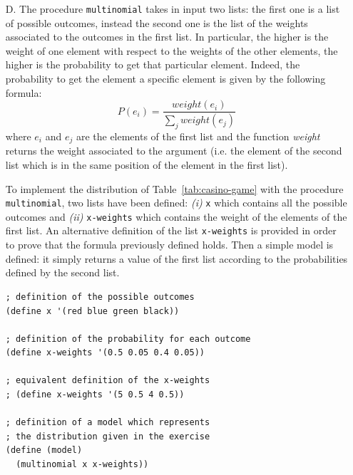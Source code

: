 \begin{itemize}
    \item[D.] The procedure \texttt{multinomial} takes in input two lists: the first one is a list of possible outcomes, instead the 
        second one is the list of the weights associated to the outcomes in the first list. In particular, the higher is the weight
        of one element with respect to the weights of the other elements, the higher is the probability to get that particular
        element. Indeed, the probability to get the element a specific element is given by the following formula:
        \[ P(e_{i}) = \frac{weight(e_{i})}{\sum_{j} weight(e_{j})} \]
        where $e_{i}$ and $e_{j}$ are the elements of the first list and the function \textit{weight} returns the weight associated
        to the argument (i.e. the element of the second list which is in the same position of the element in the first list).

        To implement the distribution of Table~\ref{tab:casino-game} with the procedure \texttt{multinomial}, two lists have been
        defined: \textit{(i)} \texttt{x} which contains all the possible outcomes and \textit{(ii)} \texttt{x-weights} which contains
        the weight of the elements of the first list. An alternative definition of the list \texttt{x-weights} is provided in order to
        prove that the formula previously defined holds.
        Then a simple model is defined: it simply returns a value of the first list according to the probabilities defined by the
        second list.
        \begin{lstlisting}[caption={Program which implements with \texttt{multinomial} the distribution of Table~\ref{tab:casino-game}}, 
            captionpos=b, label={lst:casino-game-d}]
; definition of the possible outcomes
(define x '(red blue green black))

; definition of the probability for each outcome
(define x-weights '(0.5 0.05 0.4 0.05))

; equivalent definition of the x-weights
; (define x-weights '(5 0.5 4 0.5))

; definition of a model which represents 
; the distribution given in the exercise
(define (model)
  (multinomial x x-weights))


\end{lstlisting}
\end{itemize}
